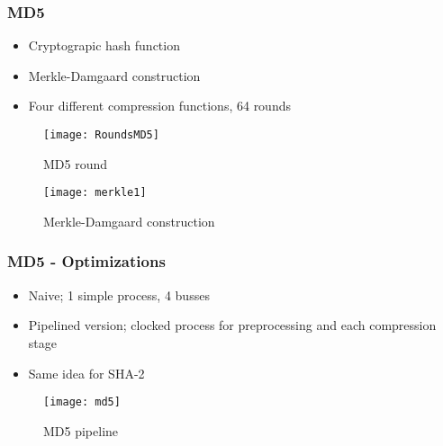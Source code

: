 \begin{frame}
  \frametitle{MD5}
  \begin{minipage}[t]{0.55\linewidth}
    \begin{itemize}
    \item Cryptograpic hash function
    \item Merkle-Damgaard construction
    \item Four different compression functions, 64 rounds
    \end{itemize}
  \end{minipage}\hfill
  \begin{minipage}[t][3cm][c]{0.45\linewidth}
    \centering
    \begin{figure}
      \centering
      \texttt{[image: RoundsMD5]}
      \caption{MD5 round}
    \end{figure}
  \end{minipage}

  \begin{minipage}[b][3.7cm][b]{0.9\linewidth}
    \begin{figure}
      \centering
      \texttt{[image: merkle1]}
      \caption{Merkle-Damgaard construction}
    \end{figure}
  \end{minipage}
\end{frame}

\begin{frame}
  \frametitle{MD5 - Optimizations}
  \begin{minipage}[t]{\linewidth}
    \begin{itemize}
    \item Naive; 1 simple process, 4 busses
    \item Pipelined version; clocked process for preprocessing and each compression stage
    \item Same idea for SHA-2
    \end{itemize}
  \end{minipage}\hfill
  \begin{minipage}[b]{\linewidth}
    \qquad
    \centering
    \begin{figure}
      \centering
      \texttt{[image: md5]}
      \caption{MD5 pipeline}
    \end{figure}
  \end{minipage}
\end{frame}

